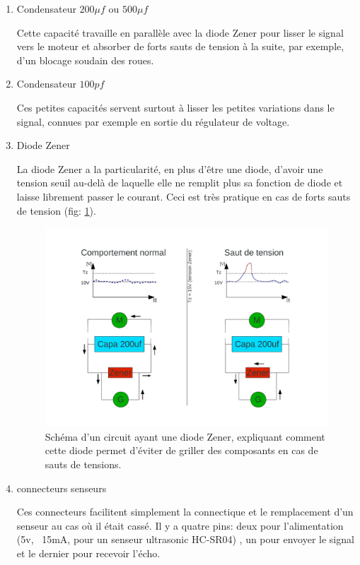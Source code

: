 \documentclass[a4paper,11pt]{report}
\begin{document}
{\begin{enumerate}
\item Condensateur $200\mu f$ ou $500\mu f$

Cette capacité travaille en parallèle avec la diode Zener pour lisser le signal vers le  moteur et absorber de forts sauts de tension à la suite, par
exemple, d'un blocage soudain des roues.

\item Condensateur $100pf$

Ces petites capacités servent surtout à lisser les petites variations dans le signal, connues par exemple en sortie du régulateur de voltage.

\item Diode Zener

La diode Zener a la particularité, en plus d'être une diode, d'avoir une tension seuil au-delà de laquelle elle ne remplit plus sa fonction de diode et laisse librement passer le courant. Ceci est très pratique en cas de forts sauts de tension (fig: \ref{zener}). 
\begin{figure}[h]
\centering
\includegraphics[width=1.0\textwidth]{CircuitZener.pdf} 
    \caption[Utilisation de la diode Zener]{\label{zener} Schéma d'un circuit ayant une diode Zener, expliquant comment cette diode permet d'éviter de griller des composants en cas de sauts de tensions. 
    }
\end{figure}


\item connecteurs senseurs

Ces connecteurs facilitent simplement la connectique et le remplacement d'un senseur au cas où il était cassé. Il y a quatre pins: deux pour l'alimentation (5v, ~15mA, pour un senseur ultrasonic HC-SR04) \cite{HC-SR04}, un pour envoyer le signal et le dernier pour recevoir l'écho.


\end{enumerate}}
\end{document}
